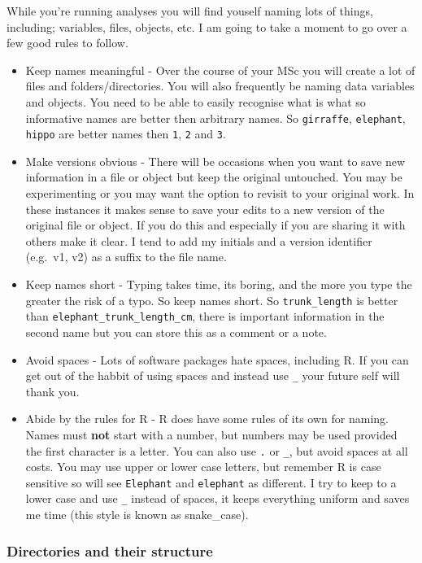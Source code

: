 \documentclass[
]{book}
\begin{document}
While you're running analyses you will find youself naming lots of things, including; variables, files, objects, etc. I am going to take a moment to go over a few good rules to follow.

\begin{itemize}
\item
  Keep names meaningful - Over the course of your MSc you will create a lot of files and folders/directories. You will also frequently be naming data variables and objects. You need to be able to easily recognise what is what so informative names are better then arbitrary names. So \texttt{girraffe}, \texttt{elephant}, \texttt{hippo} are better names then \texttt{1}, \texttt{2} and \texttt{3}.
\item
  Make versions obvious - There will be occasions when you want to save new information in a file or object but keep the original untouched. You may be experimenting or you may want the option to revisit to your original work. In these instances it makes sense to save your edits to a new version of the original file or object. If you do this and especially if you are sharing it with others make it clear. I tend to add my initials and a version identifier (e.g.~v1, v2) as a suffix to the file name.
\item
  Keep names short - Typing takes time, its boring, and the more you type the greater the risk of a typo. So keep names short. So \texttt{trunk\_length} is better than \texttt{elephant\_trunk\_length\_cm}, there is important information in the second name but you can store this as a comment or a note.
\item
  Avoid spaces - Lots of software packages hate spaces, including R. If you can get out of the habbit of using spaces and instead use \texttt{\_} your future self will thank you.
\item
  Abide by the rules for R - R does have some rules of its own for naming. Names must \textbf{not} start with a number, but numbers may be used provided the first character is a letter. You can also use \texttt{.} or \texttt{\_}, but avoid spaces at all costs. You may use upper or lower case letters, but remember R is case sensitive so will see \texttt{Elephant} and \texttt{elephant} as different. I try to keep to a lower case and use \texttt{\_} instead of spaces, it keeps everything uniform and saves me time (this style is known as snake\_case).
\end{itemize}

\subsubsection{Directories and their structure}\label{directories-and-their-structure}
\end{document}
